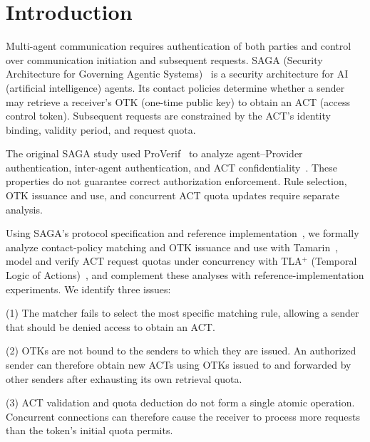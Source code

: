 
\section{Introduction}
\label{sec:introduction}

Multi-agent communication requires authentication of both parties and control over communication initiation and subsequent requests. SAGA (Security Architecture for Governing Agentic Systems)~\cite{syros2025saga} is a security architecture for AI (artificial intelligence) agents. Its contact policies determine whether a sender may retrieve a receiver's OTK (one-time public key) to obtain an ACT (access control token). Subsequent requests are constrained by the ACT's identity binding, validity period, and request quota.

The original SAGA study used ProVerif~\cite{blanchet2016proverif} to analyze agent--Provider authentication, inter-agent authentication, and ACT confidentiality~\cite{syros2025saga}. These properties do not guarantee correct authorization enforcement. Rule selection, OTK issuance and use, and concurrent ACT quota updates require separate analysis.

Using SAGA's protocol specification and reference implementation~\cite{syros2025sagaV2,sagaReferenceImpl2026}, we formally analyze contact-policy matching and OTK issuance and use with Tamarin~\cite{meier2013tamarin}, model and verify ACT request quotas under concurrency with TLA$^{+}$ (Temporal Logic of Actions)~\cite{lamport2002specifying}, and complement these analyses with reference-implementation experiments. We identify three issues:

(1) The matcher fails to select the most specific matching rule, allowing a sender that should be denied access to obtain an ACT.

(2) OTKs are not bound to the senders to which they are issued. An authorized sender can therefore obtain new ACTs using OTKs issued to and forwarded by other senders after exhausting its own retrieval quota.

(3) ACT validation and quota deduction do not form a single atomic operation. Concurrent connections can therefore cause the receiver to process more requests than the token's initial quota permits.
